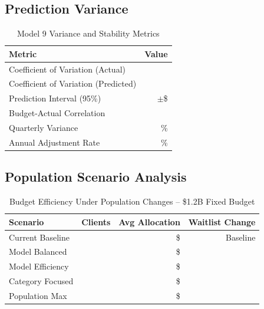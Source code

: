 \subsection{Prediction Variance}

\begin{table}[h]
\centering
\caption{Model 9 Variance and Stability Metrics}
\begin{tabular}{lr}
\toprule
\textbf{Metric} & \textbf{Value} \\
\midrule
Coefficient of Variation (Actual) & \ModelNineCVActual{} \\
Coefficient of Variation (Predicted) & \ModelNineCVPredicted{} \\
Prediction Interval (95\%) & $\pm$\$\ModelNinePredictionInterval{} \\
Budget-Actual Correlation & \ModelNineBudgetActualCorr{} \\
Quarterly Variance & \ModelNineQuarterlyVariance{}\% \\
Annual Adjustment Rate & \ModelNineAnnualAdjustmentRate{}\% \\
\bottomrule
\end{tabular}
\label{tab:model9_variance}
\end{table}

\subsection{Population Scenario Analysis}

\begin{table}[h]
\centering
\caption{Budget Efficiency Under Population Changes -- \$1.2B Fixed Budget}
\begin{tabular}{lrrr}
\toprule
\textbf{Scenario} & \textbf{Clients} & \textbf{Avg Allocation} & \textbf{Waitlist Change} \\
\midrule
Current Baseline & \ModelNinePopcurrentbaselineClients{} & \$\ModelNinePopcurrentbaselineAvgAlloc{} & Baseline \\
Model Balanced & \ModelNinePopmodelbalancedClients{} & \$\ModelNinePopmodelbalancedAvgAlloc{} & \ModelNinePopmodelbalancedWaitlistChange{} \\
Model Efficiency & \ModelNinePopmodelefficiencyClients{} & \$\ModelNinePopmodelefficiencyAvgAlloc{} & \ModelNinePopmodelefficiencyWaitlistChange{} \\
Category Focused & \ModelNinePopcategoryfocusedClients{} & \$\ModelNinePopcategoryfocusedAvgAlloc{} & \ModelNinePopcategoryfocusedWaitlistChange{} \\
Population Max & \ModelNinePoppopulationmaximizedClients{} & \$\ModelNinePoppopulationmaximizedAvgAlloc{} & \ModelNinePoppopulationmaximizedWaitlistChange{} \\
\bottomrule
\end{tabular}
\label{tab:model9_scenarios}
\end{table}

